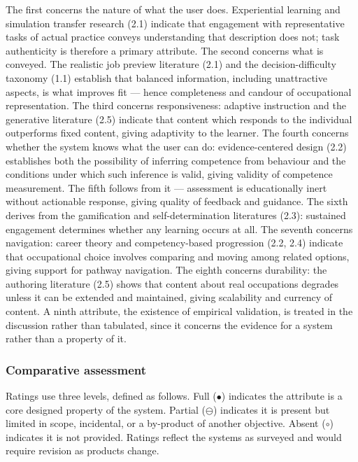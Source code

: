 The first concerns the nature of what the user does. Experiential learning and simulation transfer research (2.1) indicate that engagement with representative tasks of actual practice conveys understanding that description does not; task authenticity is therefore a primary attribute. The second concerns what is conveyed. The realistic job preview literature (2.1) and the decision-difficulty taxonomy (1.1) establish that balanced information, including unattractive aspects, is what improves fit --- hence completeness and candour of occupational representation. The third concerns responsiveness: adaptive instruction and the generative literature (2.5) indicate that content which responds to the individual outperforms fixed content, giving adaptivity to the learner. The fourth concerns whether the system knows what the user can do: evidence-centered design (2.2) establishes both the possibility of inferring competence from behaviour and the conditions under which such inference is valid, giving validity of competence measurement. The fifth follows from it --- assessment is educationally inert without actionable response, giving quality of feedback and guidance. The sixth derives from the gamification and self-determination literatures (2.3): sustained engagement determines whether any learning occurs at all. The seventh concerns navigation: career theory and competency-based progression (2.2, 2.4) indicate that occupational choice involves comparing and moving among related options, giving support for pathway navigation. The eighth concerns durability: the authoring literature (2.5) shows that content about real occupations degrades unless it can be extended and maintained, giving scalability and currency of content. A ninth attribute, the existence of empirical validation, is treated in the discussion rather than tabulated, since it concerns the evidence for a system rather than a property of it.

\subsubsection{Comparative assessment}

Ratings use three levels, defined as follows. Full ($\bullet$) indicates the attribute is a core designed property of the system. Partial ($\ominus$) indicates it is present but limited in scope, incidental, or a by-product of another objective. Absent ($\circ$) indicates it is not provided. Ratings reflect the systems as surveyed and would require revision as products change.

